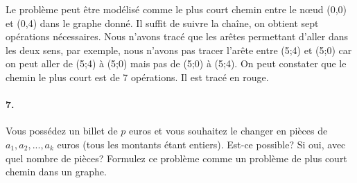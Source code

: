 \begin{solution}
Le problème peut être modélisé comme le plus court chemin entre le nœud (0,0) et (0,4) dans le graphe donné. Il suffit de suivre la chaîne, on obtient sept opérations nécessaires. Nous n'avons tracé que les arêtes permettant d'aller dans les deux sens, par exemple, nous n'avons pas tracer  l'arête entre (5;4) et (5;0) car on peut aller de (5;4) à (5;0) mais pas de (5;0) à (5;4). On peut constater que le chemin le plus court est de 7 opérations. Il est tracé en rouge.
\begin{center}
\end{center}
\end{solution}

\paragraph{7. }
	Vous possédez un billet de $p$ euros et vous souhaitez le changer en pièces de $a_1, a_2, ..., a_k$ euros (tous les montants étant entiers). Est-ce possible? Si oui, avec quel nombre de pièces? Formulez ce problème comme un problème de plus court chemin dans un graphe.


